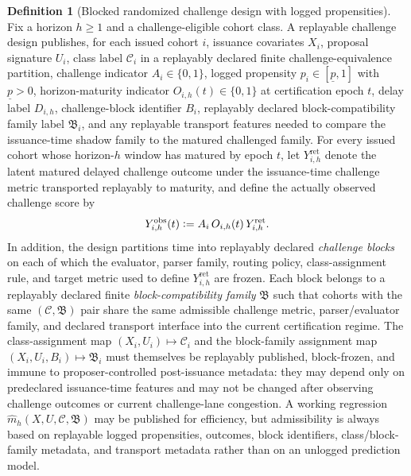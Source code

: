 \documentclass[11pt]{article}
\theoremstyle{definition}
\newtheorem{definition}[theorem]{Definition}
\newcommand{\1}{\mathbf{1}}
\newcommand{\Defeq}{\vcentcolon=}
\begin{document}
\begin{definition}[Blocked randomized challenge design with logged propensities]\label{def:challenge_design}
Fix a horizon $h\ge 1$ and a challenge-eligible cohort class. A replayable challenge design publishes, for each issued cohort $i$, issuance covariates $X_i$, proposal signature $U_i$, class label $\mathcal C_i$ in a replayably declared finite challenge-equivalence partition, challenge indicator $A_i\in\{0,1\}$, logged propensity $p_i\in[\underline p,1]$ with $\underline p>0$, horizon-maturity indicator $O_{i,h}(t)\in\{0,1\}$ at certification epoch $t$, delay label $D_{i,h}$, challenge-block identifier $B_i$, replayably declared block-compatibility family label $\mathfrak B_i$, and any replayable transport features needed to compare the issuance-time shadow family to the matured challenged family. For every issued cohort whose horizon-$h$ window has matured by epoch $t$, let $Y_{i,h}^{\mathrm{ret}}$ denote the latent matured delayed challenge outcome under the issuance-time challenge metric transported replayably to maturity, and define the actually observed challenge score by
\[
Y_{i,h}^{\mathrm{obs}}(t)\Defeq A_i\,O_{i,h}(t)\,Y_{i,h}^{\mathrm{ret}}.
\]
In addition, the design partitions time into replayably declared \emph{challenge blocks} on each of which the evaluator, parser family, routing policy, class-assignment rule, and target metric used to define $Y_{i,h}^{\mathrm{ret}}$ are frozen. Each block belongs to a replayably declared finite \emph{block-compatibility family} $\mathfrak B$ such that cohorts with the same $(\mathcal C,\mathfrak B)$ pair share the same admissible challenge metric, parser/evaluator family, and declared transport interface into the current certification regime. The class-assignment map $(X_i,U_i)\mapsto \mathcal C_i$ and the block-family assignment map $(X_i,U_i,B_i)\mapsto \mathfrak B_i$ must themselves be replayably published, block-frozen, and immune to proposer-controlled post-issuance metadata: they may depend only on predeclared issuance-time features and may not be changed after observing challenge outcomes or current challenge-lane congestion. A working regression $\widehat m_h(X,U,\mathcal C,\mathfrak B)$ may be published for efficiency, but admissibility is always based on replayable logged propensities, outcomes, block identifiers, class/block-family metadata, and transport metadata rather than on an unlogged prediction model.


\end{definition}
\end{document}
